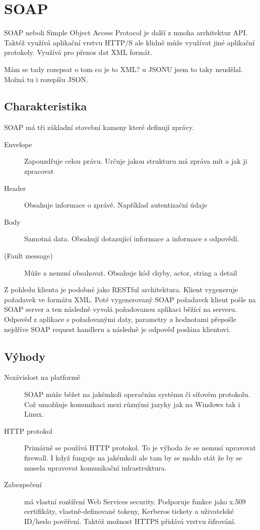 \section{SOAP}
SOAP neboli Simple Object Access Protocol je další z mnoha architektur API. Taktéž využívá aplikační vrstvu HTTP/S ale klidně může využívat jiné aplikační protokoly. Využívá pro přenos dat XML formát.

Mám se tady rozepsat o tom co je to XML? u JSONU jsem to taky neudělal. Možná tu i rozepíšu JSON.

\subsection{Charakteristika}
SOAP má tři základní stavební kameny které definují zprávy.
\begin{description}
    \item[Envelope] Zapouzdřuje celou právu. Určuje jakou strukturu má zpráva mít a jak ji zpracovat
    \item[Header] Obsahuje informace o zprávě. Například autentizační údaje
    \item[Body] Samotná data. Obsahují dotazující informace a informace s odpovědí.
    \item[(Fault message)] Může a nemusí obsahovat. Obsahuje kód chyby, actor, string a detail
\end{description}

Z pohledu klienta je podobné jako RESTful architektura. Klient vygeneruje požadavek ve formátu XML. Poté vygenerovaný SOAP požadavek klient pošle na SOAP server a ten následně vyvolá požadovanou aplikaci běžící na serveru. Odpověď z aplikace s požadovanými daty, parametry a hodnotami přepošle nejdříve SOAP request handleru a následně je odpověď poslána klientovi.

\subsection{Výhody}
\begin{description}
    \item[Nezávislost na platformě] SOAP může běžet na jakémkoli operačním systému či síťovém protokolu. Což umožňuje komunikaci mezi různými jazyky jak na Windows tak i Linux.
    \item[HTTP protokol] Primárně se používá HTTP protokol. To je výhoda že se nemusí upravovat firewall. I když funguje na jakémkoli ale tam by se mohlo stát že by se musela upravovat komunikační infrastruktura.
    \item[Zabezpečení] má vlastní rozšíření Web Services security. Podporuje funkce jako x.509 certifikáty, vlastně-definované tokeny, Kerberos tickety a uživatelské ID/heslo pověření. Taktéž možnost HTTPS přidává vrstvu šifrování.
\end{description}

